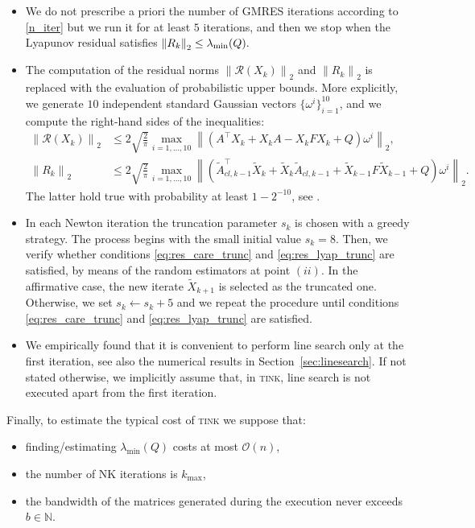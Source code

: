 \documentclass[a4paper,10pt]{article}
\newcommand{\norm}[1]{\left\lVert#1\right\rVert}
\newcommand{\upd}[1]{{\color{black}#1}} %
\begin{document}
\begin{itemize}
	\item[$(i)$] We do not prescribe a priori the number of GMRES iterations according to \eqref{n_iter} but we run it for at least $5$ iterations, and then  we stop when the Lyapunov residual satisfies
	$\norm{R_k }_2 \le \lambda_{\upd{\min}}(Q).
	$ 
	\item[$(ii)$] The computation of the residual norms $\norm{ \mathcal{R}(X_k) }_2$ and $\norm{R_k }_2$ is replaced with the evaluation of probabilistic upper bounds. More explicitly, we generate $10$ independent standard Gaussian vectors 
	$\{\omega^{i}\}_{i=1}^{10}$, and we compute the right-hand sides of the inequalities:
	\begin{equation*}
		\begin{split}
		\norm{ \mathcal{R}(X_k) }_2 &\le 2 \sqrt{\frac{2}{\pi}} \max_{i=1,\ldots,10} \norm{ (A^\top X_k + X_k A - X_kF X_k + Q) \omega^{i} }_2,\\		
		\norm{R_k }_2 &\le 2 \sqrt{\frac{2}{\pi}} \max_{i=1,\ldots,10} \norm{ (\tilde{A}_{cl,k-1}^\top  \tilde{X}_{k} + \tilde{X}_{k} \tilde{A}_{cl,k-1} +   \tilde{X}_{k-1} F \tilde{X}_{k-1}+Q) \omega^{i} }_2.
		\end{split}
	\end{equation*}
	The latter hold true with probability at least $1-2^{-10}$, see \cite{halko2011finding}.
	\item[$(iii)$] In each Newton iteration the truncation parameter $s_k$ is chosen with a greedy strategy. The process begins with the small initial value $s_k=8$. Then, we verify whether conditions \eqref{eq:res_care_trunc} and \eqref{eq:res_lyap_trunc} are satisfied, by means of the random estimators at point $(ii)$. In the affirmative case, the new iterate $\tilde{X}_{k+1}$ is selected as the truncated one. Otherwise, we set $s_k\gets s_k+5$ and we repeat the procedure until conditions \eqref{eq:res_care_trunc} and \eqref{eq:res_lyap_trunc} are satisfied. 
	\item[$(iv)$] We empirically found that it is convenient to perform line search only at the first iteration, see also the numerical results in Section~\ref{sec:linesearch}. If not stated otherwise, we implicitly assume that, in \textsc{tink}, line search is not executed apart from the first iteration.
\end{itemize} 
Finally, to estimate the typical cost of \textsc{tink} we suppose that:
\begin{itemize}
	\item finding/estimating $\lambda_{\min}(Q)$ costs at most $\mathcal O(n)$,
	\item the number of NK iterations is $k_{\max}$,
	\item the bandwidth of the matrices generated during the execution never exceeds $b\in\mathbb N$.
\end{itemize}
\end{document}
